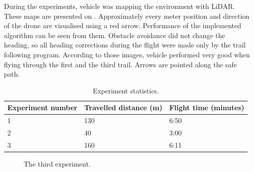During the experiments, vehicle was mapping the environment with \acs{LiDAR}. These maps are presented on . Approximately every meter position and direction of the drone are visualised using a red arrow. Performance of the implemented algorithm can be seen from them. Obstacle avoidance did not change the heading, so all heading corrections during the flight were made only by the trail following program. According to those images, vehicle performed very good when flying through the first and the third trail. Arrows are pointed along the safe path.

\begin{table}[]
\centering
\begin{tabular}{|l|l|l|}
\hline
Experiment number & Travelled distance (m) & Flight time (minutes) \\ \hline
1                 & 130                    & 6:50                  \\ \hline
2                 & 40                     & 3:00                  \\ \hline
3                 & 160                    & 6:11                  \\ \hline
\end{tabular}
\caption{Experiment statistics.}
\end{table}

\begin{figure}[!h]

  \centering

  \centering	
  


  \caption{The third experiment.}
  \label{fig:third_trail_photos}
\end{figure}


